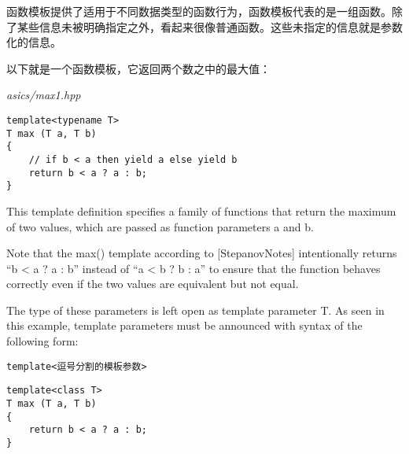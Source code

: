 

函数模板提供了适用于不同数据类型的函数行为，函数模板代表的是一组函数。除了某些信息未被明确指定之外，看起来很像普通函数。这些未指定的信息就是参数化的信息。


以下就是一个函数模板，它返回两个数之中的最大值：

\noindent
\textit{asics/max1.hpp}
\begin{lstlisting}[style=styleCXX]
template<typename T>
T max (T a, T b)
{
	// if b < a then yield a else yield b
	return b < a ? a : b;
}
\end{lstlisting}

This template definition specifies a family of functions that return the maximum of two values, which are passed as function parameters a and b.

\begin{tcolorbox}[colback=webgreen!5!white,colframe=webgreen!75!black]
\hspace*{0.75cm}Note that the max() template according to [StepanovNotes] intentionally returns “b < a ? a : b” instead of “a < b ? b : a” to ensure that the function behaves correctly even if the two values are equivalent but not equal.
\end{tcolorbox}

The type of these parameters is left open as template parameter T. As seen in this example, template parameters must be announced with syntax of the following form:

\begin{lstlisting}[style=styleCXX]
template<逗号分割的模板参数>
\end{lstlisting}

\begin{lstlisting}[style=styleCXX]
template<class T>
T max (T a, T b)
{
	return b < a ? a : b;
}
\end{lstlisting}


